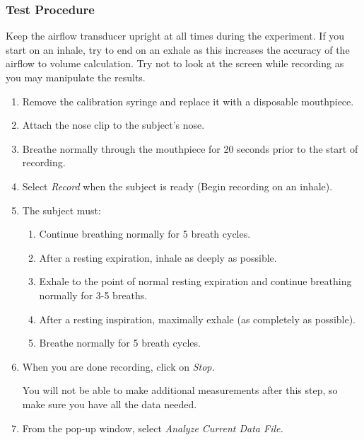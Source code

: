 \documentclass{article}
\begin{document}
\subsubsection*{Test Procedure}
\begin{info}
	Keep the airflow transducer upright at all times during the experiment. If you start on an inhale, try to end on an exhale as this increases the accuracy of the airflow to volume calculation. Try not to look at the screen while recording as you may manipulate the results.
\end{info}
\begin{enumerate}
	\item Remove the calibration syringe and replace it with a disposable mouthpiece.
	\item Attach the nose clip to the subject's nose.
	\item Breathe normally through the mouthpiece for 20 seconds prior to the start of recording.
	\item Select \textit{Record} when the subject is ready (Begin recording on an inhale).
	\item The subject must:\begin{enumerate}
		\item Continue breathing normally for 5 breath cycles.
		\item After a resting expiration, inhale as deeply as possible.
		\item Exhale to the point of normal resting expiration and continue breathing normally for 3-5 breaths.
		\item After a resting inspiration, maximally exhale (as completely as possible).
		\item Breathe normally for 5 breath cycles.
	\end{enumerate}
	
	\item When you are done recording, click on \textit{Stop.}

	\begin{info}
		You will not be able to make additional measurements after this step, so make sure you have all the data needed.
	\end{info}
	\item From the pop-up window, select \textit{Analyze Current Data File.}
\end{enumerate}
\end{document}
